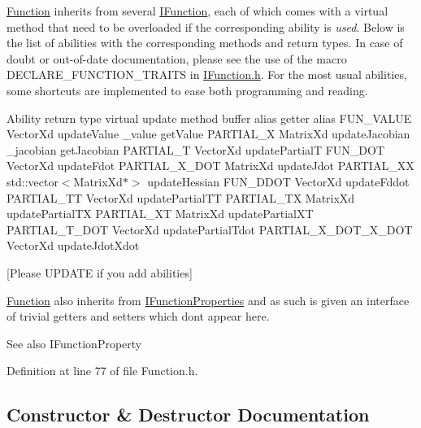 \hyperlink{classocra_1_1Function}{Function} inherits from several \hyperlink{classocra_1_1IFunction}{I\+Function}, each of which comes with a virtual method that need to be overloaded if the corresponding ability is {\itshape used}. Below is the list of abilities with the corresponding methods and return types. In case of doubt or out-\/of-\/date documentation, please see the use of the macro D\+E\+C\+L\+A\+R\+E\+\_\+\+F\+U\+N\+C\+T\+I\+O\+N\+\_\+\+T\+R\+A\+I\+TS in \hyperlink{IFunction_8h}{I\+Function.\+h}. For the most usual abilities, some shortcuts are implemented to ease both programming and reading.

Ability return type virtual update method buffer alias getter alias F\+U\+N\+\_\+\+V\+A\+L\+UE Vector\+Xd update\+Value \+\_\+value get\+Value P\+A\+R\+T\+I\+A\+L\+\_\+X Matrix\+Xd update\+Jacobian \+\_\+jacobian get\+Jacobian P\+A\+R\+T\+I\+A\+L\+\_\+T Vector\+Xd update\+PartialT F\+U\+N\+\_\+\+D\+OT Vector\+Xd update\+Fdot P\+A\+R\+T\+I\+A\+L\+\_\+\+X\+\_\+\+D\+OT Matrix\+Xd update\+Jdot P\+A\+R\+T\+I\+A\+L\+\_\+\+XX std\+::vector$<$\+Matrix\+Xd$\ast$$>$ update\+Hessian F\+U\+N\+\_\+\+D\+D\+OT Vector\+Xd update\+Fddot P\+A\+R\+T\+I\+A\+L\+\_\+\+TT Vector\+Xd update\+Partial\+TT P\+A\+R\+T\+I\+A\+L\+\_\+\+TX Matrix\+Xd update\+Partial\+TX P\+A\+R\+T\+I\+A\+L\+\_\+\+XT Matrix\+Xd update\+Partial\+XT P\+A\+R\+T\+I\+A\+L\+\_\+\+T\+\_\+\+D\+OT Vector\+Xd update\+Partial\+Tdot P\+A\+R\+T\+I\+A\+L\+\_\+\+X\+\_\+\+D\+O\+T\+\_\+\+X\+\_\+\+D\+OT Vector\+Xd update\+Jdot\+Xdot

\mbox{[}Please U\+P\+D\+A\+TE if you add abilities\mbox{]}

\hyperlink{classocra_1_1Function}{Function} also inherits from \hyperlink{classocra_1_1IFunctionProperties}{I\+Function\+Properties} and as such is given an interface of trivial getters and setters which don\textquotesingle{}t appear here. \begin{DoxySeeAlso}{See also}
I\+Function\+Property 
\end{DoxySeeAlso}


Definition at line 77 of file Function.\+h.



\subsection{Constructor \& Destructor Documentation}
\hypertarget{classocra_1_1Function_a34f827361369b0e38802fbc93a055014}{}\label{classocra_1_1Function_a34f827361369b0e38802fbc93a055014} 
